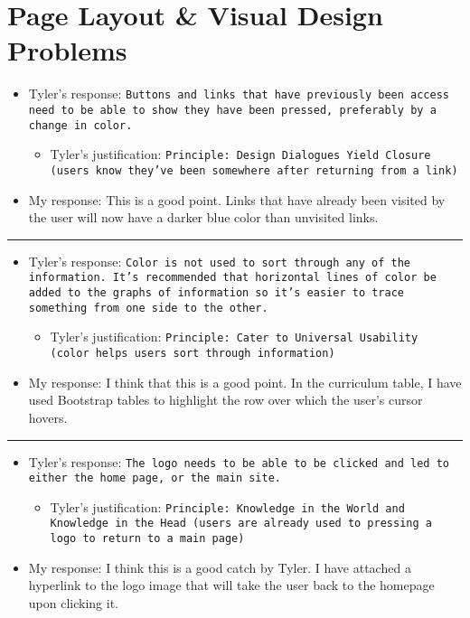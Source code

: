 \documentclass{article}
\begin{document}
\section{Page Layout \& Visual Design Problems}
\begin{itemize}
	\item Tyler's response: \texttt{Buttons and links that have previously been access need to be able to show they have been pressed, preferably by a change in color.}
	\begin{itemize}
		\item Tyler's justification: \texttt{Principle: Design Dialogues Yield Closure (users know they’ve been somewhere after returning from a link)}
	\end{itemize}
	\item My response: This is a good point.  Links that have already been visited by the user will now have a darker blue color than unvisited links.
\end{itemize}
\noindent\rule{3cm}{0.4pt}
\begin{itemize}
	\item Tyler's response: \texttt{Color is not used to sort through any of the information.  It’s recommended that horizontal lines of color be added to the graphs of information so it’s easier to trace something from one side to the other.}
	\begin{itemize}
		\item Tyler's justification: \texttt{Principle: Cater to Universal Usability (color helps users sort through information)}
	\end{itemize}
	\item My response: I think that this is a good point.  In the curriculum table, I have used Bootstrap tables to highlight the row over which the user's cursor hovers.
\end{itemize}
\noindent\rule{3cm}{0.4pt}
\begin{itemize}
	\item Tyler's response: \texttt{The logo needs to be able to be clicked and led to either the home page, or the main site.}
	\begin{itemize}
		\item Tyler's justification: \texttt{Principle: Knowledge in the World and Knowledge in the Head (users are already used to pressing a logo to return to a main page)}
	\end{itemize}
	\item My response: I think this is a good catch by Tyler.  I have attached a hyperlink to the logo image that will take the user back to the homepage upon clicking it.
\end{itemize}
\end{document}
